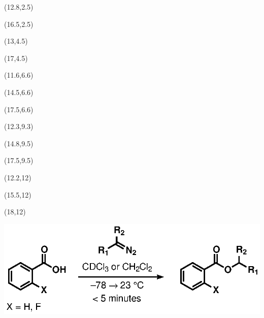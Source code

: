 \begin{table}[ht]
\begin{textblock}{1}(12.8,2.5)  \end{textblock}
\begin{textblock}{1}(16.5,2.5)  \end{textblock}
\begin{textblock}{1}(13,4.5)  \end{textblock}
\begin{textblock}{1}(17,4.5)  \end{textblock}
\begin{textblock}{1}(11.6,6.6)  \end{textblock}
\begin{textblock}{1}(14.5,6.6)  \end{textblock}
\begin{textblock}{1}(17.5,6.6)  \end{textblock}
 \begin{textblock}{1}(12.3,9.3)  \end{textblock}
 \begin{textblock}{1}(14.8,9.5)  \end{textblock}
 \begin{textblock}{1}(17.5,9.5)  \end{textblock}
 \begin{textblock}{1}(12.2,12)  \end{textblock}
 \begin{textblock}{1}(15.5,12)  \end{textblock}
 \begin{textblock}{1}(18,12)  \end{textblock}
\includegraphics[scale=0.8]{chp_asymmetric/images/astitrationhead} \\
{\small
\begin{tabular}{cccc}

\end{tabular}}
\end{table}
